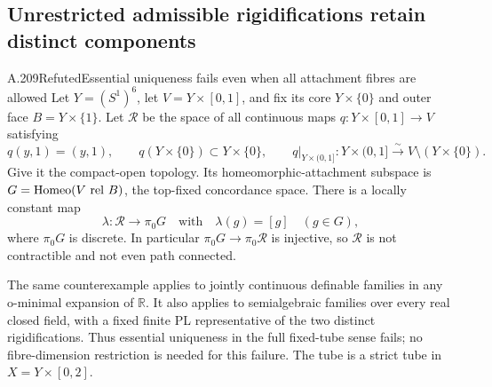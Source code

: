 \subsection{Unrestricted admissible rigidifications retain distinct components}

\begin{saresult}{A.209}{Refuted}{Essential uniqueness fails even when all attachment fibres are allowed}
Let $Y=(S^1)^6$, let $V=Y\times[0,1]$, and fix its core
$Y\times\{0\}$ and outer face $B=Y\times\{1\}$.
Let $\mathcal R$ be the space of all continuous maps
$q:Y\times[0,1]\to V$ satisfying
\[
 q(y,1)=(y,1),\qquad q(Y\times\{0\})\subset Y\times\{0\},
 \qquad q|_{Y\times(0,1]}:Y\times(0,1]\xrightarrow{\sim}
                      V\setminus(Y\times\{0\}).
\]
Give it the compact-open topology. Its homeomorphic-attachment
subspace is $G=\operatorname{Homeo}(V\ \mathrm{rel}\ B)$, the top-fixed
concordance space. There is a locally constant map
\[
 \lambda:\mathcal R\longrightarrow\pi_0G
 \quad\text{with}\quad\lambda(g)=[g]\quad(g\in G),
\]
where $\pi_0G$ is discrete. In particular
$\pi_0G\to\pi_0\mathcal R$ is injective, so $\mathcal R$ is not
contractible and not even path connected.

The same counterexample applies to jointly continuous definable
families in any o-minimal expansion of $\mathbb R$. It also applies
to semialgebraic families over every real closed field, with a fixed
finite PL representative of the two distinct rigidifications.
Thus essential uniqueness in the full fixed-tube sense fails; no
fibre-dimension restriction is needed for this failure. The tube is
a strict tube in $X=Y\times[0,2]$.
\end{saresult}

